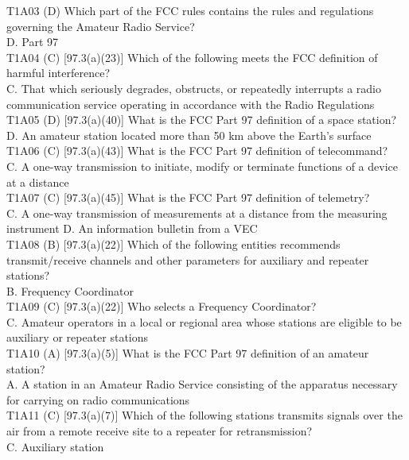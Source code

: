 \documentclass[12pt,letterpaper]{report}
\begin{document}
T1A03 (D) Which part of the FCC rules contains the rules and regulations governing the Amateur Radio Service?\\
D. Part 97\\

T1A04 (C) [97.3(a)(23)] Which of the following meets the FCC definition of harmful interference?\\
C. That which seriously degrades, obstructs, or repeatedly interrupts a radio communication service operating in accordance with the Radio Regulations\\

T1A05 (D) [97.3(a)(40)] What is the FCC Part 97 definition of a space station?\\
D. An amateur station located more than 50 km above the Earth's surface\\

T1A06 (C) [97.3(a)(43)] What is the FCC Part 97 definition of telecommand?\\
C. A one-way transmission to initiate, modify or terminate functions of a device at a distance\\

T1A07 (C) [97.3(a)(45)] What is the FCC Part 97 definition of telemetry?\\
C. A one-way transmission of measurements at a distance from the measuring instrument D. An information bulletin from a VEC\\

T1A08 (B) [97.3(a)(22)] Which of the following entities recommends transmit/receive channels and other parameters for auxiliary and repeater stations?\\
B. Frequency Coordinator\\

T1A09 (C) [97.3(a)(22)] Who selects a Frequency Coordinator?\\
C. Amateur operators in a local or regional area whose stations are eligible to be auxiliary or repeater stations\\

T1A10 (A) [97.3(a)(5)] What is the FCC Part 97 definition of an amateur station?\\
A. A station in an Amateur Radio Service consisting of the apparatus necessary for carrying on radio communications\\

T1A11 (C) [97.3(a)(7)] Which of the following stations transmits signals over the air from a remote receive site to a repeater for retransmission?\\
C. Auxiliary station\\
\end{document}
